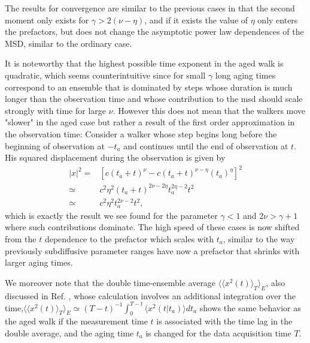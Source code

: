 The results for convergence are similar to the previous cases in that the second moment only exists for $\gamma>2(\nu-\eta)$, and if it exists the value of $\eta$ only enters the prefactors, but does not change the asymptotic power law dependences of the MSD, similar to the ordinary case.

It is noteworthy that the highest possible time exponent in the aged walk is quadratic, which seems counterintuitive since for small $\gamma$ long aging times correspond to an ensemble that is dominated by steps whose duration is much longer than the observation time and whose contribution to the \gls{msd} should scale strongly with time for large $\nu$. However this does not mean that the walkers move "slower" in the aged case but rather a result of the first order approximation in the observation time: Consider a walker whose step begins long before the beginning of observation at $-t_a$ and continues until the end of observation at $t$. His squared displacement during the observation is given by
%
\begin{align}
|x|^2 =& [c (t_a+t)^{\nu} - c (t_a+t)^{\nu-\eta} (t_a)^{\eta} ]^2\\
\simeq & c^2 \eta^2  (t_a+t)^{2\nu-2\eta} t_a^{2 \eta -2} t^2 \\
\simeq & c^2 \eta^2 t_a^{2 \nu -2} t^2 ,
\end{align}
%
which is exactly the result we see found for the parameter $\gamma <1$ and $2\nu > \gamma+1$ where such contributions dominate. The high speed of these cases is now shifted from the $t$ dependence to the prefactor which scales with $t_a$, similar to the way previously subdiffusive parameter ranges have now a prefactor that shrinks with larger aging times.

We moreover note that the double time-ensemble average $\langle \langle x^2 (t) \rangle_T \rangle_E$, also discussed in Ref. \cite{radons2018}, whose calculation involves an additional integration over the time,$\langle \langle x^2 (t) \rangle_T \rangle_E \simeq (T-t)^{-1} \int_0^{T-t} \langle x^2 (t|t_a) \rangle dt_a$  shows the same behavior as the aged walk if the measurement time $t$ is associated with the time lag in the double average, and the aging time $t_a$ is changed for the data acquisition time $T$.   

